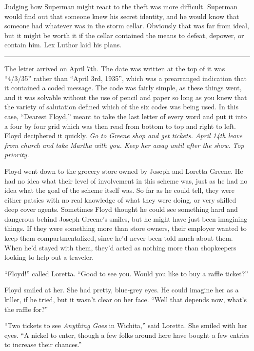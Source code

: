 Judging how Superman might react to the theft was more difficult.
Superman would find out that someone knew his secret identity, and he
would know that someone had whatever was in the storm cellar. Obviously
that was far from ideal, but it might be worth it if the cellar
contained the means to defeat, depower, or contain him. Lex Luthor laid
his plans.

\begin{center}\rule{0.5\linewidth}{0.5pt}\end{center}

The letter arrived on April 7th. The date was written at the top of it
was ``4/3/35'' rather than ``April 3rd, 1935'', which was a prearranged
indication that it contained a coded message. The code was fairly
simple, as these things went, and it was solvable without the use of
pencil and paper so long as you knew that the variety of salutation
defined which of the six codes was being used. In this case, ``Dearest
Floyd,'' meant to take the last letter of every word and put it into a
four by four grid which was then read from bottom to top and right to
left. Floyd deciphered it quickly. \emph{Go to Greene shop and get
tickets. April 14th leave from church and take Martha with you. Keep her
away until after the show. Top priority.}

Floyd went down to the grocery store owned by Joseph and Loretta Greene.
He had no idea what their level of involvement in this scheme was, just
as he had no idea what the goal of the scheme itself was. So far as he
could tell, they were either patsies with no real knowledge of what they
were doing, or very skilled deep cover agents. Sometimes Floyd thought
he could see something hard and dangerous behind Joseph Greene's smiles,
but he might have just been imagining things. If they were something
more than store owners, their employer wanted to keep them
compartmentalized, since he'd never been told much about them. When he'd
stayed with them, they'd acted as nothing more than shopkeepers looking
to help out a traveler.

``Floyd!'' called Loretta. ``Good to see you. Would you like to buy a
raffle ticket?''

Floyd smiled at her. She had pretty, blue‐grey eyes. He could imagine
her as a killer, if he tried, but it wasn't clear on her face. ``Well
that depends now, what's the raffle for?''

``Two tickets to see \emph{Anything Goes} in Wichita,'' said Loretta.
She smiled with her eyes. ``A nickel to enter, though a few folks around
here have bought a few entries to increase their chances.''

